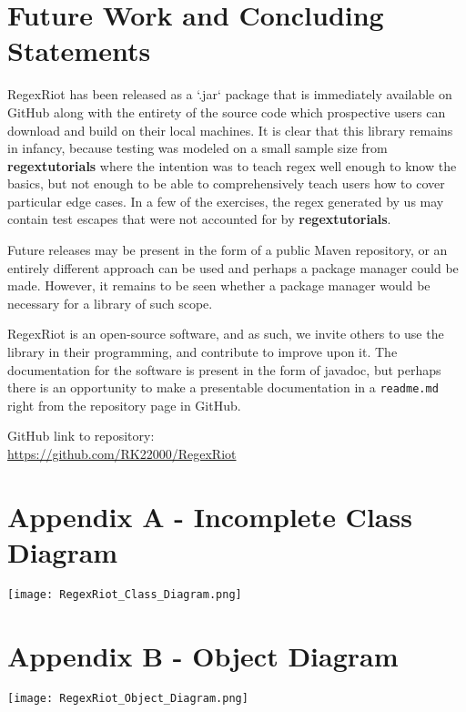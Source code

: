 \documentclass[conference]{IEEEtran}
\begin{document}
\section{Future Work and Concluding Statements}

RegexRiot has been released as a `.jar` package that is immediately available
on GitHub along with the entirety of the source code which prospective users
can download and build on their local machines. It is clear that this library
remains in infancy, because testing was modeled on a small sample size from
\textbf{regextutorials} where the intention was to
teach regex well enough to know the basics, but not enough to be able to
comprehensively teach users how to cover particular edge cases.
In a few of the exercises, the regex generated by us may contain test escapes
that were not accounted for by \textbf{regextutorials}.\cite{regextutorials}

Future releases may be present in the form of a public Maven repository,
or an entirely different approach can be used and perhaps a package manager
could be made. However, it remains to be seen whether a package manager would
be necessary for a library of such scope.

RegexRiot is an open-source software, and as such, we invite others to use the library
in their programming, and contribute to improve upon it. The documentation for
the software is present in the form of javadoc, but perhaps there is an
opportunity to make a presentable documentation in a \texttt{readme.md}
right from the repository page in GitHub.

GitHub link to repository:\\
\url{https://github.com/RK22000/RegexRiot}




\onecolumn
\appendices
\section*{Appendix A - Incomplete Class Diagram}
\centering
\texttt{[image: RegexRiot\_Class\_Diagram.png]}
\label{appendix:classdiagram}

\section*{Appendix B - Object Diagram}
\centering
\texttt{[image: RegexRiot\_Object\_Diagram.png]}
\label{appendix:objdiagram}
\end{document}
